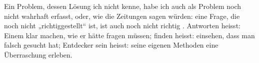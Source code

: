Ein Problem, dessen Lösung ich nicht kenne, habe ich auch als Problem noch nicht wahrhaft erfasst, oder, wie die Zeitungen sagen würden: eine Frage, die noch nicht „richtiggestellt“ ist, ist auch noch nicht richtig . Antworten heisst: Einem klar machen, wie er hätte fragen müssen; finden heisst: einsehen, dass man falsch gesucht hat; Entdecker sein heisst:  seine eigenen Methoden eine Überraschung erleben.
\par

